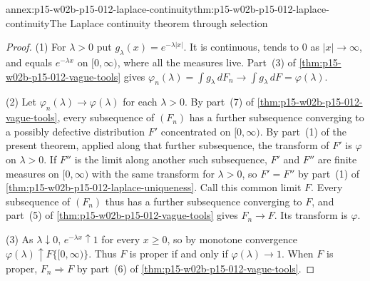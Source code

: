 \begin{annexitem}{annex:p15-w02b-p15-012-laplace-continuity}{thm:p15-w02b-p15-012-laplace-continuity}{The Laplace continuity theorem through selection}
\begin{proof}
(1) For \(\lambda>0\) put \(g_\lambda(x)=e^{-\lambda|x|}\). It is continuous,
tends to \(0\) as \(|x|\to\infty\), and equals \(e^{-\lambda x}\) on
\([0,\infty)\), where all the measures live. Part~(3) of
\cref{thm:p15-w02b-p15-012-vague-tools} gives
\(\varphi_n(\lambda)=\int g_\lambda\,dF_n\to\int g_\lambda\,dF=\varphi(\lambda)\).

(2) Let \(\varphi_n(\lambda)\to\varphi(\lambda)\) for each \(\lambda>0\). By
part~(7) of \cref{thm:p15-w02b-p15-012-vague-tools}, every subsequence of
\((F_n)\) has a further subsequence converging to a possibly defective
distribution \(F'\) concentrated on \([0,\infty)\). By part~(1) of the present
theorem, applied along that further subsequence, the transform of \(F'\) is
\(\varphi\) on \(\lambda>0\). If \(F''\) is the limit along another such
subsequence, \(F'\) and \(F''\) are finite measures on \([0,\infty)\) with the
same transform for \(\lambda>0\), so \(F'=F''\) by part~(1) of
\cref{thm:p15-w02b-p15-012-laplace-uniqueness}. Call this common limit \(F\).
Every subsequence of \((F_n)\) thus has a further subsequence converging to
\(F\), and part~(5) of \cref{thm:p15-w02b-p15-012-vague-tools} gives
\(F_n\to F\). Its transform is \(\varphi\).

(3) As \(\lambda\downarrow0\), \(e^{-\lambda x}\uparrow1\) for every
\(x\geq0\), so by monotone convergence \(\varphi(\lambda)\uparrow F\{[0,\infty)\}\).
Thus \(F\) is proper if and only if \(\varphi(\lambda)\to1\). When \(F\) is
proper, \(F_n\Rightarrow F\) by part~(6) of
\cref{thm:p15-w02b-p15-012-vague-tools}.
\end{proof}
\end{annexitem}

